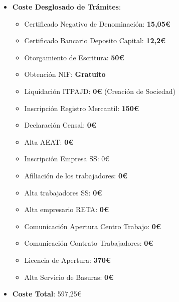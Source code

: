 \begin{itemize}
    \item \textbf{Coste Desglosado de Trámites}:
    \begin{itemize}
        \item Certificado Negativo de Denominación: \textbf{15,05€}
        \item Certificado Bancario Deposito Capital: \textbf{12,2€}
        \item Otorgamiento de Escritura: \textbf{50€}
        \item Obtención NIF: \textbf{Gratuito}
        \item Liquidación ITPAJD: \textbf{0€} (Creación de Sociedad)
        \item Inscripción Registro Mercantil: \textbf{150€}
        \item Declaración Censal: \textbf{0€}
        \item Alta AEAT: \textbf{0€}
        \item Inscripción Empresa SS: {0€}
        \item Afiliación de los trabajadores: \textbf{0€}
        \item Alta trabajadores SS: \textbf{0€}
        \item Alta empresario RETA: \textbf{0€}
        \item Comunicación Apertura Centro Trabajo: \textbf{0€}
        \item Comunicación Contrato Trabajadores: \textbf{0€}
        \item Licencia de Apertura: \textbf{370€}
        \item Alta Servicio de Basuras: \textbf{0€}
    \end{itemize}

    \item \textbf{Coste Total}: 597,25€
\end{itemize}





%
%

